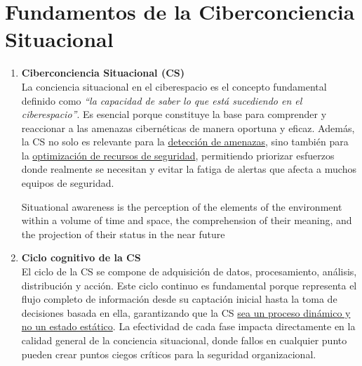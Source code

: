 \section{Fundamentos de la Ciberconciencia Situacional}
\begin{enumerate}
\item \textbf{Ciberconciencia Situacional (CS)} \\
La conciencia situacional en el ciberespacio es el concepto fundamental definido como \textit{``la capacidad de saber lo que está sucediendo en el ciberespacio''}. Es esencial porque constituye la base para comprender y reaccionar a las amenazas cibernéticas de manera oportuna y eficaz.
Además, la CS no solo es relevante para la \ul{detección de amenazas}, sino también para la \ul{optimización de recursos de seguridad}, permitiendo priorizar esfuerzos donde realmente se necesitan y evitar la fatiga de alertas que afecta a muchos equipos de seguridad.

\begin{definition}
   Situational awareness is the perception of the elements of the environment within
   a volume of time and space, the comprehension of their meaning, and the
   projection of their status in the near future
\end{definition}

\item \textbf{Ciclo cognitivo de la CS} \\
El ciclo de la CS se compone de adquisición de datos, procesamiento, análisis, distribución y acción. Este ciclo continuo es fundamental porque representa el flujo completo de información desde su captación inicial hasta la toma de decisiones basada en ella, garantizando que la CS \ul{sea un proceso dinámico y no un estado estático}. La efectividad de cada fase impacta directamente en la calidad general de la conciencia situacional, donde fallos en cualquier punto pueden crear puntos ciegos críticos para la seguridad organizacional.


\end{enumerate}
